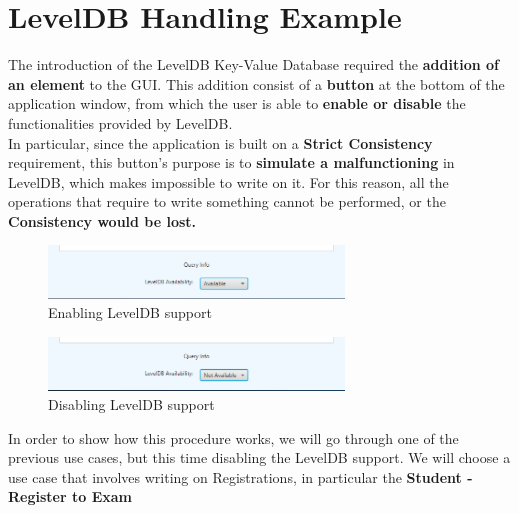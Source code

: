 \documentclass{report}
\begin{document}
\section*{LevelDB Handling Example}
The introduction of the LevelDB Key-Value Database required the \textbf{addition of an element} to the GUI. This addition consist of a \textbf{button} at the bottom of the application window, from which the user is able to \textbf{enable or disable} the functionalities provided by LevelDB.\\ 
In particular, since the application is built on a\textbf{ Strict Consistency} requirement, this button's purpose is to \textbf{simulate a malfunctioning} in LevelDB, which makes impossible to write on it. For this reason, all the operations that require to write something cannot be performed, or the\textbf{ Consistency would be lost.}
\begin{figure} [h!]
	\centering
	\includegraphics[width=0.7\textwidth]{LevelDBAvailable.png}
	\caption{Enabling LevelDB support }
	\label{fig:LevelDBAvailable}
\end{figure}
\begin{figure} [h!]
	\centering
	\includegraphics[width=0.7\textwidth]{LevelDBNotAvailable.png}
	\caption{Disabling LevelDB support}
	\label{fig:LevelDBNotAvailable}
\end{figure}

In order to show how this procedure works, we will go through one of the previous use cases, but this time disabling the LevelDB support. We will choose a use case that involves writing on Registrations, in particular the \textbf{Student - Register to Exam}
\end{document}

